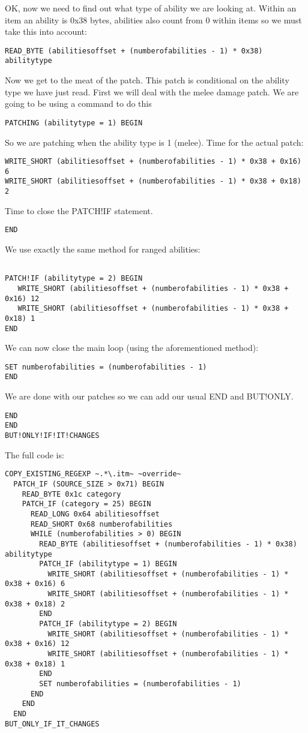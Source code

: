 \documentclass{article}
\def\ttref#1{\ahrefloc{#1}{\tt #1}}
\begin{document}
OK, now we need to find out what type of ability we are looking at. Within
an item an ability is 0x38 bytes, abilities also count from 0 within items
so we must take this into account:
\begin{verbatim}
READ_BYTE (abilitiesoffset + (numberofabilities - 1) * 0x38) abilitytype
\end{verbatim}
Now we get to the meat of the patch. This patch is conditional on the
ability type we have just read. First we will deal with the melee damage
patch. We are going to be using a \ttref{PATCH!IF} command to do this

\begin{verbatim}
PATCHING (abilitytype = 1) BEGIN
\end{verbatim}
So we are patching when the ability type is 1 (melee). Time for the actual patch:
\begin{verbatim}
WRITE_SHORT (abilitiesoffset + (numberofabilities - 1) * 0x38 + 0x16) 6
WRITE_SHORT (abilitiesoffset + (numberofabilities - 1) * 0x38 + 0x18) 2
\end{verbatim}
Time to close the PATCH!IF statement.
\begin{verbatim}
END
\end{verbatim}
We use exactly the same method for ranged abilities:
\begin{verbatim}

PATCH!IF (abilitytype = 2) BEGIN
   WRITE_SHORT (abilitiesoffset + (numberofabilities - 1) * 0x38 + 0x16) 12
   WRITE_SHORT (abilitiesoffset + (numberofabilities - 1) * 0x38 + 0x18) 1
END
\end{verbatim}
We can now close the main loop (using the aforementioned method):
\begin{verbatim}
SET numberofabilities = (numberofabilities - 1)
END
\end{verbatim}
We are done with our patches so we can add our usual END and BUT!ONLY.
\begin{verbatim}
END
END
BUT!ONLY!IF!IT!CHANGES
\end{verbatim}
The full code is:
\begin{verbatim}
COPY_EXISTING_REGEXP ~.*\.itm~ ~override~
  PATCH_IF (SOURCE_SIZE > 0x71) BEGIN
    READ_BYTE 0x1c category
    PATCH_IF (category = 25) BEGIN
      READ_LONG 0x64 abilitiesoffset
      READ_SHORT 0x68 numberofabilities
      WHILE (numberofabilities > 0) BEGIN
        READ_BYTE (abilitiesoffset + (numberofabilities - 1) * 0x38) abilitytype
        PATCH_IF (abilitytype = 1) BEGIN
          WRITE_SHORT (abilitiesoffset + (numberofabilities - 1) * 0x38 + 0x16) 6
          WRITE_SHORT (abilitiesoffset + (numberofabilities - 1) * 0x38 + 0x18) 2
        END
        PATCH_IF (abilitytype = 2) BEGIN
          WRITE_SHORT (abilitiesoffset + (numberofabilities - 1) * 0x38 + 0x16) 12
          WRITE_SHORT (abilitiesoffset + (numberofabilities - 1) * 0x38 + 0x18) 1
        END
        SET numberofabilities = (numberofabilities - 1)
      END
    END
  END
BUT_ONLY_IF_IT_CHANGES
\end{verbatim}
\end{document}
